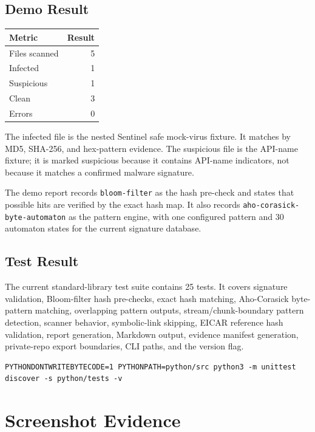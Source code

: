 \documentclass[11pt]{article}
\begin{document}
\subsection{Demo Result}

\begin{center}
\begin{tabular}{lr}
\toprule
\textbf{Metric} & \textbf{Result} \\
\midrule
Files scanned & 5 \\
Infected & 1 \\
Suspicious & 1 \\
Clean & 3 \\
Errors & 0 \\
\bottomrule
\end{tabular}
\end{center}

The infected file is the nested Sentinel safe mock-virus fixture. It matches by
MD5, SHA-256, and hex-pattern evidence. The suspicious file is the API-name
fixture; it is marked suspicious because it contains API-name indicators, not
because it matches a confirmed malware signature.

The demo report records \texttt{bloom-filter} as the hash pre-check and states
that possible hits are verified by the exact hash map. It also records
\texttt{aho-corasick-byte-automaton} as the pattern engine, with one configured
pattern and 30 automaton states for the current signature database.

\subsection{Test Result}

The current standard-library test suite contains 25 tests. It covers signature
validation, Bloom-filter hash pre-checks, exact hash matching, Aho-Corasick
byte-pattern matching, overlapping pattern outputs, stream/chunk-boundary
pattern detection, scanner behavior, symbolic-link skipping, EICAR reference
hash validation, report generation, Markdown output, evidence manifest
generation, private-repo export boundaries, CLI paths, and the version flag.

\begin{lstlisting}[style=sentinel]
PYTHONDONTWRITEBYTECODE=1 PYTHONPATH=python/src python3 -m unittest discover -s python/tests -v
\end{lstlisting}

\clearpage
\section{Screenshot Evidence}
\end{document}
